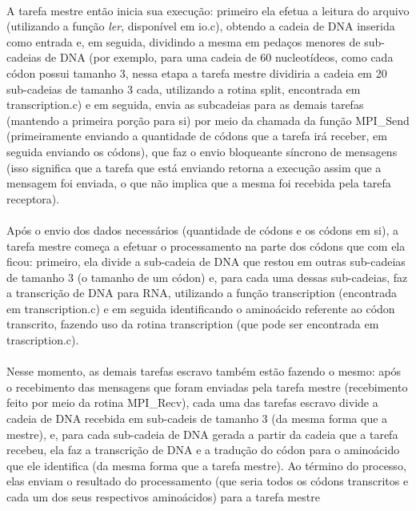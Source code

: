 \documentclass[a4paper,10pt]{article}
\begin{document}
\paragraph{}A tarefa mestre então inicia sua execução: primeiro ela efetua a leitura do arquivo (utilizando a função \emph{ler}, disponível em io.c), obtendo a cadeia de DNA inserida como entrada e, em seguida, dividindo a mesma em pedaços menores de sub-cadeias de DNA (por exemplo, para uma cadeia de 60 nucleotídeos, como cada códon possui tamanho 3, nessa etapa a tarefa mestre dividiria a cadeia em 20 sub-cadeias de tamanho 3 cada, utilizando a rotina split, encontrada em transcription.c) e em seguida, envia as subcadeias para as demais tarefas (mantendo a primeira porção para si) por meio da chamada da função MPI\_Send (primeiramente enviando a quantidade de códons que a tarefa irá receber, em seguida enviando os códons), que faz o envio bloqueante síncrono de mensagens (isso significa que a tarefa que está enviando retorna a execução assim que a mensagem foi enviada, o que não implica que a mesma foi recebida pela tarefa receptora).\\
\paragraph{}Após o envio dos dados necessários (quantidade de códons e os códons em si), a tarefa mestre começa a efetuar o processamento na parte dos códons que com ela ficou: primeiro, ela divide a sub-cadeia de DNA que restou em outras sub-cadeias de tamanho 3 (o tamanho de um códon) e, para cada uma dessas sub-cadeias, faz a transcrição de DNA para RNA, utilizando a função transcription (encontrada em transcription.c) e em seguida identificando o aminoácido referente ao códon transcrito, fazendo uso da rotina transcription (que pode ser encontrada em trascription.c).\\
\paragraph{}Nesse momento, as demais tarefas escravo também estão fazendo o mesmo: após o recebimento das mensagens que foram enviadas pela tarefa mestre (recebimento feito por meio da rotina MPI\_Recv), cada uma das tarefas escravo divide a cadeia de DNA recebida em sub-cadeis de tamanho 3 (da mesma forma que a mestre), e, para cada sub-cadeia de DNA gerada a partir da cadeia que a tarefa recebeu, ela faz a transcrição de DNA e a tradução do códon para o aminoácido que ele identifica (da mesma forma que a tarefa mestre). Ao término do processo, elas enviam o resultado do processamento (que seria todos os códons transcritos e cada um dos seus respectivos aminoácidos) para a tarefa mestre\\
\end{document}
